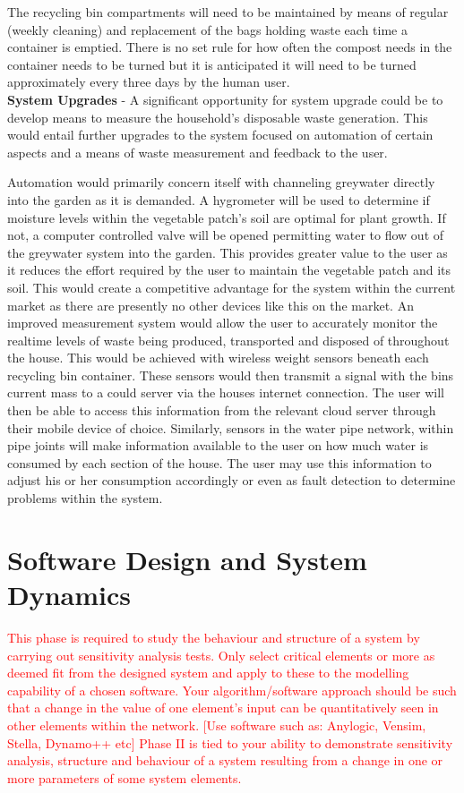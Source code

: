 \documentclass[a4paper,11pt,fleqn]{report}
\begin{document}
The recycling bin compartments will need to be maintained by means of regular (weekly cleaning) and replacement of the bags holding waste each time a container is emptied. There is no set rule for how often the compost needs in the container needs to be turned but it is anticipated it will need to be turned approximately every three days by the human user. \\

\textbf{System Upgrades} - A significant opportunity for system upgrade could be to develop means to measure the household's disposable waste generation. This would entail further upgrades to the system focused on automation of certain aspects and a means of waste measurement and feedback to the user. 

Automation would primarily concern itself with channeling greywater directly into the garden as it is demanded. A hygrometer will be used to determine if moisture levels within the vegetable patch's soil are optimal for plant growth. If not, a computer controlled valve will be opened permitting water to flow out of the greywater system into the garden. This provides greater value to the user as it reduces the effort required by the user to maintain the vegetable patch and its soil. This would create a competitive advantage for the system within the current market as there are presently no other devices like this on the market.
An improved measurement system would allow the user to accurately monitor the realtime levels of waste being produced, transported and disposed of throughout the house. This would be achieved with wireless weight sensors beneath each recycling bin container. These sensors would then transmit a signal with the bins current mass to a could server via the houses internet connection. The user will then be able to access this information from the relevant cloud server through their mobile device of choice. Similarly, sensors in the water pipe network, within pipe joints will make information available to the user on how much water is consumed by each section of the house. The user may use this information to adjust his or her consumption accordingly or even as fault detection to determine problems within the system. 

\chapter{Software Design and System Dynamics}
\textcolor{red}{This phase is required to study the behaviour and structure of a system by carrying out sensitivity analysis tests. Only select critical elements or more as deemed fit from the designed system and apply to these to the modelling capability of a chosen software.
Your algorithm/software approach should be such that a change in the value of one element’s input can be quantitatively seen in other elements within the network. [Use software such as: Anylogic, Vensim, Stella, Dynamo++ etc]
Phase II is tied to your ability to demonstrate sensitivity analysis, structure and behaviour of a system resulting from a change in one or more parameters of some system elements.}
\end{document}
